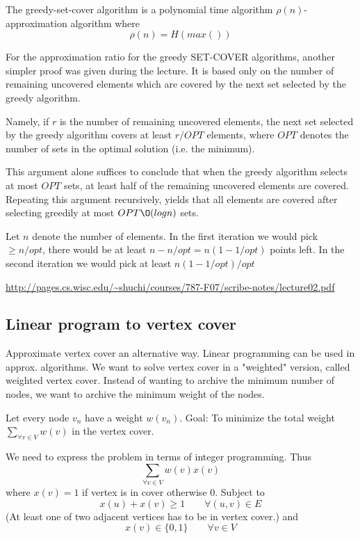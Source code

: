 \documentclass[10pt]{article}
\begin{document}
The greedy-set-cover algorithm is a polynomial time algorithm $\rho(n)$-approximation algorithm where 
\begin{equation}
  \rho(n) = H(max())
\end{equation}

For the approximation ratio for the greedy SET-COVER algorithms, another simpler proof was given during the lecture. It is based only on the number of remaining uncovered elements which are covered by the next set selected by the greedy algorithm. 

Namely, if $r$ is the number of remaining uncovered elements, the next set selected by the greedy algorithm covers at least $r/OPT$ elements, where $OPT$ denotes the number of sets in the optimal solution (i.e. the minimum). 

This argument alone suffices to conclude that when the greedy algorithm selects at most $OPT$ sets, at least half of the remaining uncovered elements are covered. Repeating this argument recursively, yields that all elements are covered after selecting greedily at most $OPT \O(log n)$ sets.

Let $n$ denote the number of elements. In the first iteration we would pick $\geq n/opt$, there would be at least $n-n/opt=n(1-1/opt)$ points left. In the second iteration we would pick at least $n(1-1/opt)/opt$


\url{http://pages.cs.wisc.edu/~shuchi/courses/787-F07/scribe-notes/lecture02.pdf}



\subsection{Linear program to vertex cover} %
\label{sub:linear_program_to_set_cover}
Approximate vertex cover an alternative way. Linear programming can be used in approx. algorithms. We want to solve vertex cover in a "weighted" version, called weighted vertex cover. Instead of wanting to archive the minimum number of nodes, we want to archive the minimum weight of the nodes.

Let every node $v_n$ have a weight $w(v_n)$. Goal: To minimize the total weight $\sum_{\forall v \in V} w(v)$ in the vertex cover. 

We need to express the problem in terms of integer programming. Thus
\begin{equation}
\sum_{\forall v \in V} w(v) x(v)  
\end{equation}
where $x(v)=1$ if vertex is in cover otherwise $0$. Subject to
\begin{equation}
  x(u)+x(v) \geq 1 \qquad \forall (u,v) \in E
\end{equation}
(At least one of two adjacent vertices has to be in vertex cover.) and
\begin{equation}
    x(v)  \in \{0,1\} \qquad \forall v \in V 
\end{equation}
\end{document}
